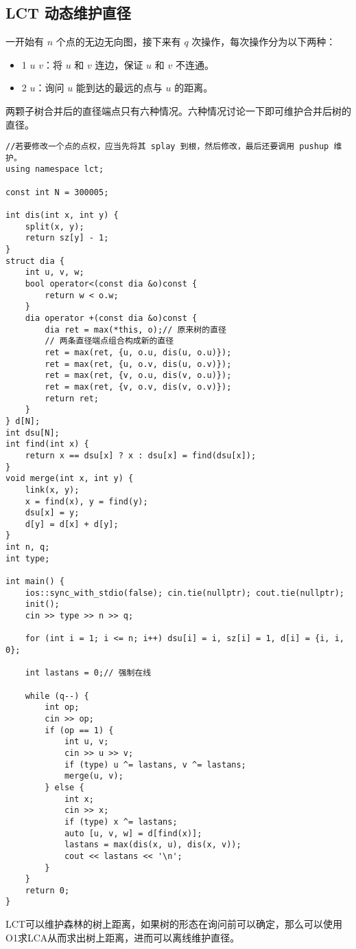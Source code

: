 \subsection{LCT 动态维护直径}
\begin{tcolorbox}
\par \noindent 一开始有 $n$ 个点的无边无向图，接下来有 $q$ 次操作，每次操作分为以下两种：
\begin{itemize}
\item 1 $u$ $v$：将 $u$ 和 $v$ 连边，保证 $u$ 和 $v$ 不连通。
\item 2 $u$：询问 $u$ 能到达的最远的点与 $u$ 的距离。
\end{itemize}
\end{tcolorbox}
\par \noindent 两颗子树合并后的直径端点只有六种情况。六种情况讨论一下即可维护合并后树的直径。

\begin{verbatim}
//若要修改一个点的点权，应当先将其 splay 到根，然后修改，最后还要调用 pushup 维护。
using namespace lct;

const int N = 300005;

int dis(int x, int y) {
    split(x, y);
    return sz[y] - 1;
}
struct dia {
    int u, v, w;
    bool operator<(const dia &o)const {
        return w < o.w;
    }
    dia operator +(const dia &o)const {
        dia ret = max(*this, o);// 原来树的直径
        // 两条直径端点组合构成新的直径
        ret = max(ret, {u, o.u, dis(u, o.u)});
        ret = max(ret, {u, o.v, dis(u, o.v)});
        ret = max(ret, {v, o.u, dis(v, o.u)});
        ret = max(ret, {v, o.v, dis(v, o.v)});
        return ret;
    }
} d[N];
int dsu[N];
int find(int x) {
    return x == dsu[x] ? x : dsu[x] = find(dsu[x]);
}
void merge(int x, int y) {
    link(x, y);
    x = find(x), y = find(y);
    dsu[x] = y;
    d[y] = d[x] + d[y];
}
int n, q;
int type;

int main() {
    ios::sync_with_stdio(false); cin.tie(nullptr); cout.tie(nullptr);
    init();
    cin >> type >> n >> q;

    for (int i = 1; i <= n; i++) dsu[i] = i, sz[i] = 1, d[i] = {i, i, 0};

    int lastans = 0;// 强制在线

    while (q--) {
        int op;
        cin >> op;
        if (op == 1) {
            int u, v;
            cin >> u >> v;
            if (type) u ^= lastans, v ^= lastans;
            merge(u, v);
        } else {
            int x;
            cin >> x;
            if (type) x ^= lastans;
            auto [u, v, w] = d[find(x)];
            lastans = max(dis(x, u), dis(x, v));
            cout << lastans << '\n';
        }
    }
    return 0;
}
\end{verbatim}
\par \noindent LCT可以维护森林的树上距离，如果树的形态在询问前可以确定，那么可以使用O1求LCA从而求出树上距离，进而可以离线维护直径。



